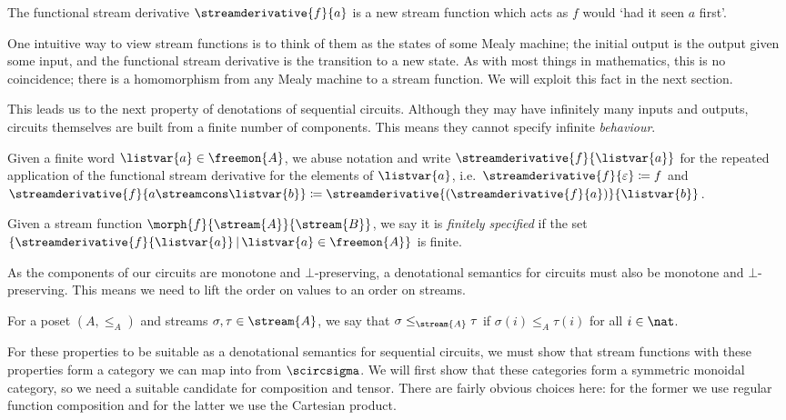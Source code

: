 \documentclass{lmcs}
\begin{document}
The functional stream derivative \(\streamderivative{f}{a}\) is a new stream
function which acts as \(f\) would `had it seen \(a\) first'.

\begin{rem}
    One intuitive way to view stream functions is to think of them as the states
    of some Mealy machine; the initial output is the output given some input,
    and the functional stream derivative is the transition to a new state.
    As with most things in mathematics, this is no coincidence; there is a
    homomorphism from any Mealy machine to a stream function.
    We will exploit this fact in the next section.
\end{rem}

This leads us to the next property of denotations of sequential circuits.
Although they may have infinitely many inputs and outputs, circuits themselves
are built from a finite number of components.
This means they cannot specify infinite \emph{behaviour}.

\begin{nota}
    Given a finite word \(\listvar{a} \in \freemon{A}\), we abuse notation
    and write \(\streamderivative{f}{\listvar{a}}\) for the repeated
    application of the functional stream derivative for the elements of
    \(\listvar{a}\), i.e.\ \(
    \streamderivative{f}{\varepsilon} \coloneqq f
    \) and \(
    \streamderivative{f}{a \streamcons \listvar{b}} \coloneqq
    \streamderivative{(\streamderivative{f}{a})}{\listvar{b}}
    \).
\end{nota}

\begin{defi}
    Given a stream function \(\morph{f}{\stream{A}}{\stream{B}}\), we say it is
    \emph{finitely specified} if the set \(\{
    \streamderivative{f}{\listvar{a}} \,|\, \listvar{a} \in \freemon{A}
    \}\) is finite.
\end{defi}

As the components of our circuits are monotone and \(\bot\)-preserving, a
denotational semantics for circuits must also be monotone and
\(\bot\)-preserving.
This means we need to lift the order on values to an order on streams.

\begin{nota}
    For a poset \((A, \leq_A)\) and streams \(\sigma,\tau \in \stream{A}\), we
    say that \(\sigma \leq_{\stream{A}} \tau\) if \(\sigma(i) \leq_A \tau(i)\)
    for all \(i \in \nat\).
\end{nota}

For these properties to be suitable as a denotational semantics for
sequential circuits, we must show that stream functions with these
properties form a category we can map into from \(\scircsigma\).
We will first show that these categories form a symmetric monoidal category, so
we need a suitable candidate for composition and tensor.
There are fairly obvious choices here: for the former we use regular function
composition and for the latter we use the Cartesian product.
\end{document}
